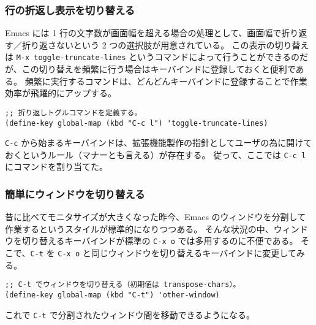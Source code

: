 \subsubsection{行の折返し表示を切り替える}
Emacs には 1 行の文字数が画面幅を超える場合の処理として、画面幅で折り返す／折り返さないという 2 つの選択肢が用意されている。
この表示の切り替えは \texttt{M-x toggle-truncate-lines} というコマンドによって行うことができるのだが、この切り替えを頻繁に行う場合はキーバインドに登録しておくと便利である。
頻繁に実行するコマンドは、どんどんキーバインドに登録することで作業効率が飛躍的にアップする。
\begin{mdframed}[roundcorner=0.50zw,leftmargin=3.00zw,rightmargin=3.00zw,skipabove=0.40zw,skipbelow=0.40zw,innertopmargin=4.00pt,innerbottommargin=4.00pt,innerleftmargin=5.00pt,innerrightmargin=5.00pt,linecolor=gray!020,linewidth=0.50pt,backgroundcolor=gray!20]
\begin{verbatim}
;; 折り返しトグルコマンドを定義する。
(define-key global-map (kbd "C-c l") 'toggle-truncate-lines)
\end{verbatim}
\end{mdframed}
\texttt{C-c} から始まるキーバインドは、拡張機能製作の指針としてユーザの為に開けておくというルール（マナーとも言える）が存在する。
従って、ここでは \texttt{C-c l} にコマンドを割り当てた。
\subsubsection{簡単にウィンドウを切り替える}
昔に比べてモニタサイズが大きくなった昨今、Emacs のウィンドウを分割して作業するというスタイルが標準的になりつつある。
そんな状況の中、ウィンドウを切り替えるキーバインドが標準の \texttt{C-x o} では多用するのに不便である。
そこで、\texttt{C-t} を \texttt{C-x o} と同じウィンドウを切り替えるキーバインドに変更してみる。
\begin{mdframed}[roundcorner=0.50zw,leftmargin=3.00zw,rightmargin=3.00zw,skipabove=0.40zw,skipbelow=0.40zw,innertopmargin=4.00pt,innerbottommargin=4.00pt,innerleftmargin=5.00pt,innerrightmargin=5.00pt,linecolor=gray!020,linewidth=0.50pt,backgroundcolor=gray!20]
\begin{verbatim}
;; C-t でウィンドウを切り替える（初期値は transpose-chars）。
(define-key global-map (kbd "C-t") 'other-window)
\end{verbatim}
\end{mdframed}
これで \texttt{C-t} で分割されたウィンドウ間を移動できるようになる。
